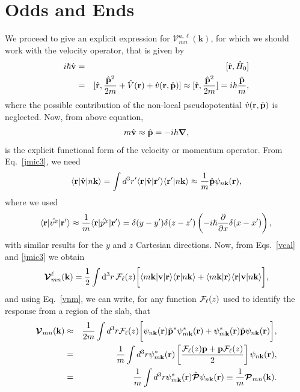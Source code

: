 \documentclass[floatfix,prb,aps,superscriptaddress,11pt,preprint]{revtex4}
\begin{document}
\section{Odds and Ends}
We proceed to give an explicit expression for 
$\mathcal{V}^{a,\ell}_{mn}(\mathbf{k})$,
for which we should work with  
the velocity operator, that is given by
\begin{eqnarray}\label{vop2} 
i\hbar\hat{\mathbf{v}}&=&[\hat{\mathbf{r}},\hat{H}_0]
\nonumber\\
&=&
[\hat{\mathbf{r}},\frac{\hat{\mathbf{p}}^2}{2m} +
\hat{V}(\mathbf{r})+\hat{v}(\mathbf{r},\hat{\mathbf{p}})]
\approx
[\hat{\mathbf{r}},\frac{\hat{\mathbf{p}}^2}{2m}]=i\hbar\frac{\hat{\mathbf{p}}}{m},
\end{eqnarray} 
where the possible contribution of 
the non-local pseudopotential $\hat{v}(\mathbf{r},\hat{\mathbf{p}})$
is neglected. Now, from above equation,
\begin{equation}\label{velo}
m\hat{\mathbf{v}}\approx\hat{\mathbf{p}}=-i\hbar\boldsymbol{\mathcal {\nabla}},
\end{equation}
is the explicit functional form of the velocity or momentum operator.
From Eq.~\eqref{jmic3}, we need 
\begin{equation}\label{vnm}
\langle \mathbf{r} | \hat{\mathbf v} | n\mathbf{k} \rangle
=\int d^3 r' \langle \mathbf{r} |\hat{\mathbf{v}}| \mathbf{r}' \rangle
\langle {\mathbf{r}'} | {n\mathbf{k}} \rangle
\approx\frac{1}{m}\hat{\mathbf{p}}\psi_{n\mathbf{k}}(\mathbf{r}),
\end{equation} 
where we used 
\begin{equation}\label{rvnk}
\langle \mathbf{r} |\hat{v^x}| \mathbf{r}' \rangle
\approx \frac{1}{m}\langle \mathbf{r} |\hat{p^x}| \mathbf{r}' \rangle
=
\delta(y-y')\delta(z-z')\left(-i\hbar\frac{\partial}{\partial x}\delta(x-x')\right),
\end{equation}
with similar results for the $y$ and $z$ Cartesian directions.
Now, from 
Eqs.~\eqref{vcal} and \eqref{jmic3} we obtain
\begin{equation}
{\boldsymbol{\mathcal{V}}}^{\ell}_{mn}({\mathbf k})=
\frac{1}{2}
\int \mathrm{d}^3 r\,
 {\mathbf{\cal F}}_\ell(z)
\bigg[
\langle m\mathbf{k}|\mathbf{v} | \mathbf{r}\rangle
\langle \mathbf{r} | n \mathbf k \rangle +
\langle m\mathbf{k} | \mathbf{r}\rangle
\langle \mathbf{r} | \mathbf{v} | n \mathbf k \rangle\bigg],
\label{intj}
\end{equation}   
and using Eq.~\eqref{vnm},
we can write, for any  function ${\mathbf{\cal F}}_\ell(z)$ used
to identify the response from a region of the slab, that
\begin{eqnarray}\label{pofs}
{\boldsymbol{\mathcal{V}}}_{mn}(\mathbf{k})&\approx&
\frac{1}{2m}\int d^3 r
{\mathbf{\cal F}}_\ell(z)
 \bigg[
\psi_{n\mathbf{k}}(\mathbf{r})
\hat{\mathbf{p}}^*\psi^*_{m\mathbf{k}}(\mathbf{r})
+ 
\psi^*_{m\mathbf{k}}(\mathbf{r})\hat{\mathbf{p}}
\psi_{n\mathbf{k}}(\mathbf{r})
\bigg], \label{pofs1}  \\
&=&
\frac{1}{m}\int d^3 r
\psi^*_{m\mathbf{k}}(\mathbf{r})
\left[\frac{{\mathbf{\cal F}}_\ell(z) \mathbf{p} +
\mathbf{p} {\mathbf{\cal F}}_\ell(z)}{2}\right]
\psi_{n\mathbf{k}}(\mathbf{r})
,\label{pofs2} \\
&=&\frac{1}{m}\int d^3 r
\psi^*_{m\mathbf{k}}(\mathbf{r})\hat{\boldsymbol{\mathcal{P}}}
\psi_{n\mathbf{k}}(\mathbf{r})\equiv \frac{1}{m}{\boldsymbol{\mathcal{P}}}_{mn}(\mathbf{k}).
\end{eqnarray}
\end{document}
